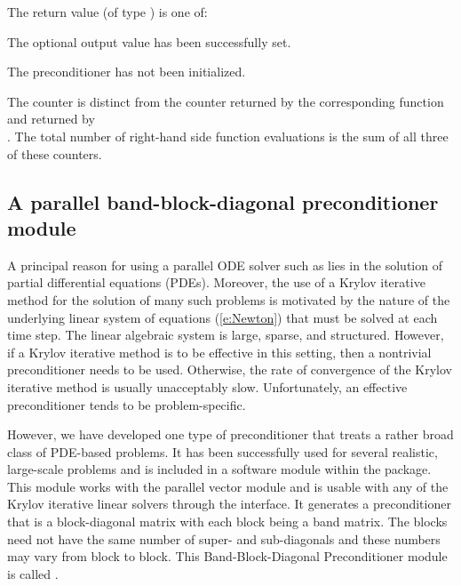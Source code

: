 {
  The return value  (of type ) is one of:
  \begin{args}
  \item[\Id{CVLS\_SUCCESS}]
    The optional output value has been successfully set.
  \item[\Id{CVLS\_PMEM\_NULL}]
    The {\cvbandpre} preconditioner has not been initialized.
  \end{args}
}
{
The counter  is distinct from the counter 
returned by the corresponding function  and
 returned by\\ \noindent {}.
The total number of right-hand side function evaluations is the
sum of all three of these counters.
}

\subsection{A parallel band-block-diagonal preconditioner module}
\label{sss:cvbbdpre}

A principal reason for using a parallel ODE solver such as {\cvodes} lies
in the solution of partial differential equations (PDEs).  Moreover,
the use of a Krylov iterative method for the solution of many such
problems is motivated by the nature of the underlying linear system of
equations (\ref{e:Newton}) that must be solved at each time step.  The
linear algebraic system is large, sparse, and structured. However, if
a Krylov iterative method is to be effective in this setting, then a
nontrivial preconditioner needs to be used.  Otherwise, the rate of
convergence of the Krylov iterative method is usually unacceptably
slow.  Unfortunately, an effective preconditioner tends to be
problem-specific.

However, we have developed one type of preconditioner that treats a
rather broad class of PDE-based problems.  It has been successfully
used for several realistic, large-scale problems \cite{HiTa:98} and is
included in a software module within the {\cvodes} package. This module
works with the parallel vector module {\nvecp} and is usable with any of
the Krylov iterative linear solvers through the {\cvls} interface.
It generates a preconditioner that is a block-diagonal matrix with
each block being a band matrix. The blocks need not have the same
number of super- and sub-diagonals and these numbers may vary from
block to block. This Band-Block-Diagonal Preconditioner module is
called {\cvbbdpre}.

